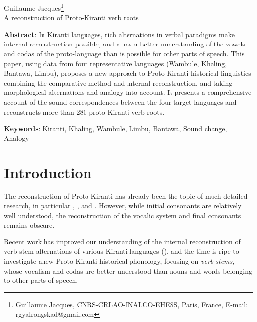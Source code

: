 \documentclass[oneside,a4paper,11pt]{article}
\renewcommand*{\thefootnote}{\fnsymbol{footnote}}
\begin{document}
\begin{Large}
\noindent
Guillaume Jacques\footnote{Guillaume Jacques, CNRS-CRLAO-INALCO-EHESS, Paris, France, E-mail: rgyalrongskad@gmail.com} \\
A reconstruction of Proto-Kiranti verb roots
\end{Large}
\sloppy

\setcounter{footnote}{0}
\renewcommand*{\thefootnote}{\arabic{footnote}}

\textbf{Abstract}: In Kiranti languages, rich alternations in verbal paradigms make internal reconstruction possible, and allow a better understanding of the vowels and codas of the proto-language than is possible for other parts of speech. This paper, using data from four representative languages (Wambule, Khaling, Bantawa, Limbu), proposes a new approach to Proto-Kiranti historical linguistics combining the comparative method and internal reconstruction, and taking morphological alternations and analogy into account. It presents a comprehensive account of the sound correspondences between the four target languages and reconstructs more than 280 proto-Kiranti verb roots.

\textbf{Keywords}: Kiranti, Khaling, Wambule, Limbu, Bantawa, Sound change, Analogy

 

\section{Introduction}
The reconstruction of Proto-Kiranti has already been the topic of much detailed research, in particular \citet{starostin94kiranti}, \citet{michailovsky94stops}, \citet{opgenort05jero} and \citet{michailovsky10kiranti}. However, while  initial consonants are relatively well understood, the reconstruction of the vocalic system and final consonants remains obscure.  

Recent work has improved our understanding of the internal reconstruction of verb stem alternations of various Kiranti languages (\citealt{michailovsky02dico, lahaussois11thulung, jacques12khaling, michailovsky12dumi}), and the time is ripe to investigate anew Proto-Kiranti historical phonology, focusing on \textit{verb stems}, whose vocalism and codas are better understood than nouns and words belonging to other parts of speech.
\end{document}
